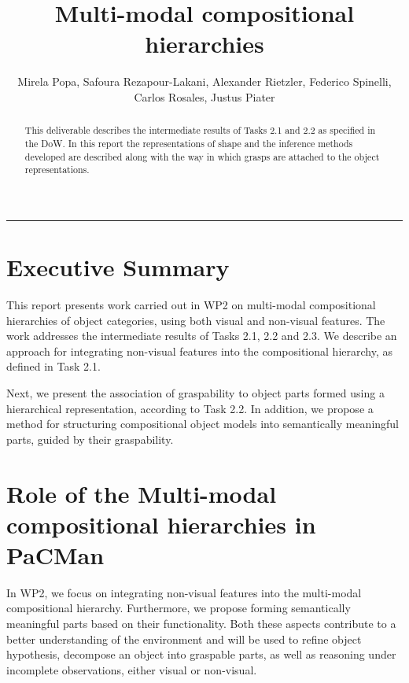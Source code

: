 \documentclass[a4paper,11pt,pdf]{pacmanreport}
\title{Multi-modal compositional hierarchies}
\author{Mirela Popa, Safoura Rezapour-Lakani, Alexander Rietzler, Federico Spinelli, Carlos Rosales, Justus Piater}
\begin{document}
\maketitle

\begin{abstract}
\noindent This deliverable describes the intermediate results of Tasks 2.1 and 2.2 as specified in the DoW. In this report the representations of shape and the inference methods developed are described along with the way in which grasps are attached to the object representations.
\end{abstract}

\vspace{.2em}
\hrule

\footnotesize

\tableofcontents

\normalsize

\newpage

\section*{Executive Summary}

This report presents work carried out in WP2 on multi-modal compositional hierarchies of object categories, using both visual and non-visual features. The work addresses the intermediate results of Tasks 2.1, 2.2 and 2.3. We describe an approach for integrating non-visual features into the compositional hierarchy, as defined in Task 2.1.

Next, we present the association of graspability to object parts formed using a hierarchical representation, according to Task 2.2. In addition, we propose a method for structuring compositional object models into semantically meaningful parts, guided by their graspability.

\section*{Role of the Multi-modal compositional hierarchies in PaCMan}

In WP2, we focus on integrating non-visual features into the multi-modal compositional hierarchy. Furthermore, we propose forming semantically meaningful parts based on their functionality. Both these aspects contribute to a better understanding of the environment and  will be used to refine object hypothesis, decompose an object into graspable parts, as well as reasoning under incomplete observations, either visual or non-visual.
\end{document}
